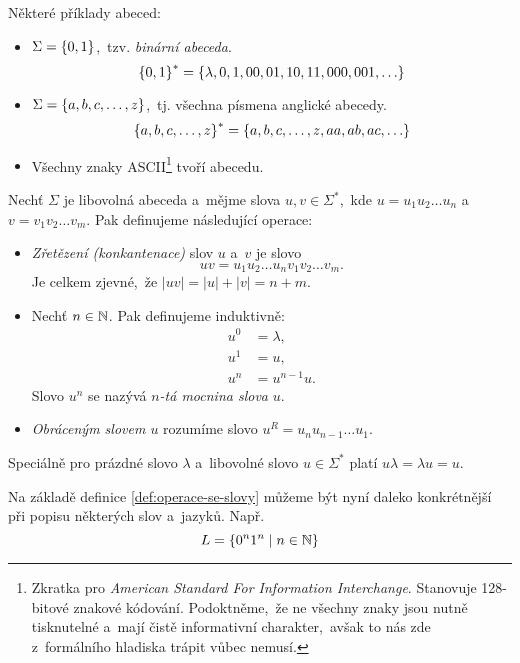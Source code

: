 \begin{example}
    Některé příklady abeced:
    \begin{itemize}
        \item $\Sigma=\left\{0,1\right\}$,~tzv. \emph{binární abeceda}.
        \[\left\{0,1\right\}^*=\left\{\lambda,0,1,00,01,10,11,000,001,\ldots\right\}\]
        \item $\Sigma=\left\{a,b,c,\ldots,z\right\}$,~tj. všechna písmena anglické abecedy.
        \[\left\{a,b,c,\ldots,z\right\}^*=\left\{a,b,c,\ldots,z,aa,ab,ac,\ldots\right\}\]
        \item Všechny znaky ASCII\footnote{Zkratka pro \emph{American Standard For Information Interchange}. Stanovuje 128-bitové znakové kódování. Podoktněme,~že ne všechny znaky jsou nutně tisknutelné a~mají čistě informativní charakter,~avšak to nás zde z~formálního hladiska trápit vůbec nemusí.} tvoří abecedu.
    \end{itemize}
\end{example}
\begin{definition}\label{def:operace-se-slovy}
    Nechť $\Sigma$ je libovolná abeceda a~mějme slova $u,v\in\Sigma^*$,~kde $u=u_1u_2\ldots u_n$ a~$v=v_1v_2\ldots v_m$. Pak definujeme následující operace:
    \begin{itemize}
        \item \emph{Zřetězení (konkantenace)} slov $u$ a~$v$ je slovo
        \[uv=u_1u_2\ldots u_nv_1v_2\ldots v_m.\]
        Je celkem zjevné,~že $|uv|=|u|+|v|=n+m$.
        \item Nechť $n\in\mathbb{N}$. Pak definujeme induktivně:
        \begin{align*}
            u^0&=\lambda,\\
            u^1&=u,\\
            u^n&=u^{n-1}u.
        \end{align*}
        Slovo $u^n$ se nazývá \emph{$n$-tá mocnina slova} $u$.
        \item \emph{Obráceným slovem $u$} rozumíme slovo $u^R=u_nu_{n-1}\ldots u_1$.
    \end{itemize}
\end{definition}
\begin{remark}
    Speciálně pro prázdné slovo $\lambda$ a~libovolné slovo $u\in\Sigma^*$ platí $u\lambda=\lambda u=u$.
\end{remark}
Na základě definice \ref{def:operace-se-slovy} můžeme být nyní daleko konkrétnější při popisu některých slov a~jazyků. Např.
\[L=\left\{0^n1^n\mid n\in\mathbb{N}\right\}\]
